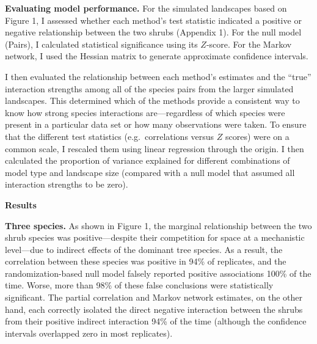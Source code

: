 \documentclass[12pt,]{article}
\begin{document}
\begin{spacing}{1.9}
\begin{flushleft}
\noindent \textbf{Evaluating model performance.} For the simulated
landscapes based on Figure 1, I assessed whether each method's test
statistic indicated a positive or negative relationship between the two
shrubs (Appendix 1). For the null model (Pairs), I calculated
statistical significance using its \(Z\)-score. For the Markov network,
I used the Hessian matrix to generate approximate confidence intervals.

I then evaluated the relationship between each method's estimates and
the ``true'' interaction strengths among all of the species pairs from
the larger simulated landscapes. This determined which of the methods
provide a consistent way to know how strong species interactions
are---regardless of which species were present in a particular data set
or how many observations were taken. To ensure that the different test
statistics (e.g.~correlations versus \(Z\) scores) were on a common
scale, I rescaled them using linear regression through the origin. I
then calculated the proportion of variance explained for different
combinations of model type and landscape size (compared with a null
model that assumed all interaction strengths to be zero).

\noindent
\textbf{Results}

\noindent \textbf{Three species.} As shown in Figure 1, the marginal
relationship between the two shrub species was positive---despite their
competition for space at a mechanistic level---due to indirect effects
of the dominant tree species. As a result, the correlation between these
species was positive in 94\% of replicates, and the randomization-based
null model falsely reported positive associations 100\% of the time.
Worse, more than 98\% of these false conclusions were statistically
significant. The partial correlation and Markov network estimates, on
the other hand, each correctly isolated the direct negative interaction
between the shrubs from their positive indirect interaction 94\% of the
time (although the confidence intervals overlapped zero in most
replicates).


\end{flushleft}
\end{spacing}
\end{document}
